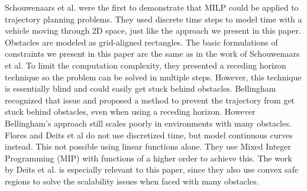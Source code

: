Schouwenaars et al. \cite{Schouwenaars2001} were the first to demonstrate that MILP could be applied to trajectory planning problems. They used discrete time steps to model time with a vehicle moving through 2D space, just like the approach we present in this paper. Obstacles are modeled as grid-aligned rectangles. The basic formulations of constraints we present in this paper are the same as in the work of Schouwenaars et al. To limit the computation complexity, they presented a receding horizon technique so the problem can be solved in multiple steps. However, this technique is essentially blind and could easily get stuck behind obstacles. Bellingham\cite{Bellingham2002} recognized that issue and proposed a method to prevent the trajectory from get stuck behind obstacles, even when using a receding horizon. However Bellingham's approach still scales poorly in environments with many obstacles.\\
Flores\cite{Flores2007} and Deits et al\cite{Deits2015} do not use discretized time, but model continuous curves instead. This not possible using linear functions alone. They use Mixed Integer Programming (MIP) with functions of a higher order to achieve this. The work by Deits et al. is especially relevant to this paper, since they also use convex safe regions to solve the scalability issues when faced with many obstacles. \\
